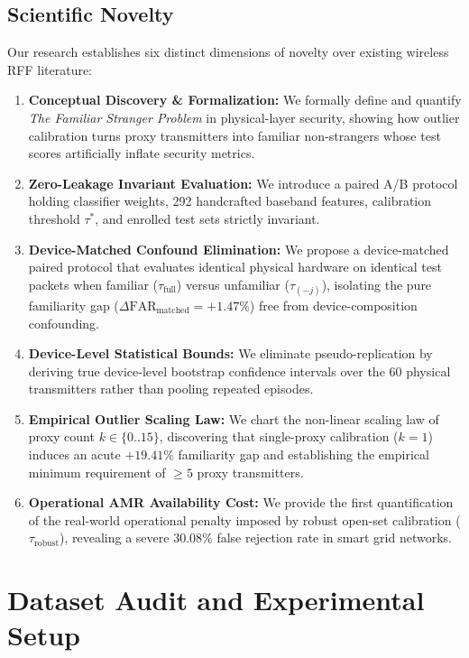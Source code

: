 \documentclass[conference]{IEEEtran}
\begin{document}
\subsection{Scientific Novelty}
Our research establishes six distinct dimensions of novelty over existing wireless RFF literature:
\begin{enumerate}
    \item \textbf{Conceptual Discovery \& Formalization:} We formally define and quantify \textit{The Familiar Stranger Problem} in physical-layer security, showing how outlier calibration turns proxy transmitters into familiar non-strangers whose test scores artificially inflate security metrics.
    \item \textbf{Zero-Leakage Invariant Evaluation:} We introduce a paired A/B protocol holding classifier weights, 292 handcrafted baseband features, calibration threshold $\tau^*$, and enrolled test sets strictly invariant.
    \item \textbf{Device-Matched Confound Elimination:} We propose a device-matched paired protocol that evaluates identical physical hardware on identical test packets when familiar ($\tau_{\text{full}}$) versus unfamiliar ($\tau_{(-j)}$), isolating the pure familiarity gap ($\Delta\text{FAR}_{\text{matched}} = +1.47\%$) free from device-composition confounding.
    \item \textbf{Device-Level Statistical Bounds:} We eliminate pseudo-replication by deriving true device-level bootstrap confidence intervals over the 60 physical transmitters rather than pooling repeated episodes.
    \item \textbf{Empirical Outlier Scaling Law:} We chart the non-linear scaling law of proxy count $k \in \{0..15\}$, discovering that single-proxy calibration ($k=1$) induces an acute $+19.41\%$ familiarity gap and establishing the empirical minimum requirement of $\ge 5$ proxy transmitters.
    \item \textbf{Operational AMR Availability Cost:} We provide the first quantification of the real-world operational penalty imposed by robust open-set calibration ($\tau_{\text{robust}}$), revealing a severe $30.08\%$ false rejection rate in smart grid networks.
\end{enumerate}

\section{Dataset Audit and Experimental Setup}
\end{document}
